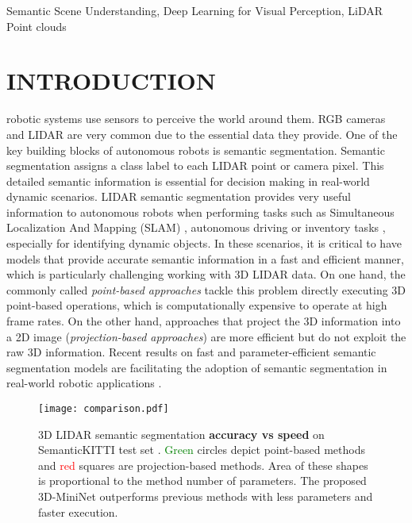 \documentclass[letterpaper, 10 pt, journal, twoside]{IEEEtran}
\begin{document}
\begin{IEEEkeywords}
Semantic Scene Understanding, Deep Learning for Visual Perception, LiDAR Point clouds
\end{IEEEkeywords}


\section{INTRODUCTION}
  robotic systems use sensors to perceive the world around them. RGB cameras and LIDAR are very common due to the essential data they provide. 
 One of the key building blocks of autonomous robots is semantic segmentation. Semantic segmentation assigns a class label to each LIDAR point or camera pixel.  This detailed semantic information is essential for decision making in real-world dynamic scenarios. 
 LIDAR semantic segmentation provides very useful information to autonomous robots when performing tasks such as Simultaneous Localization And Mapping (SLAM) \cite{jian2019semantic, zhao2019lidar}, autonomous driving \cite{milioto2019rangenet++} or inventory tasks \cite{chen2020sloam}, especially for identifying dynamic objects.
 In these scenarios, it is critical to have models that provide accurate semantic information in a  fast and efficient manner, which is particularly challenging working with 3D LIDAR data. 
 On one hand, the commonly called \textit{point-based approaches} \cite{qi2017pointnet++,qi2017pointnet,tangentconv} tackle this problem directly executing 3D point-based operations, which is computationally expensive to operate at high frame rates. On the other hand, approaches that project the 3D information into a 2D image (\textit{projection-based approaches}) are more efficient  \cite{wu2019squeezesegv2,milioto2019rangenet++,wu2018squeezeseg, wang2018pointseg, dewan2019deeptemporalseg} but do not exploit the raw 3D information. 
 Recent results on fast \cite{milioto2019rangenet++} and parameter-efficient \cite{zhang2019shellnet} semantic segmentation models are facilitating the adoption of semantic segmentation in real-world robotic applications \cite{li2020integrate, behley2019semantickitti}. 
  
  
\begin{figure}[!t]
\centering
\texttt{[image: comparison.pdf]}
\caption{3D LIDAR semantic segmentation \textbf{accuracy vs speed} on SemanticKITTI test set \cite{behley2019semantickitti}.
\textcolor{Green}{Green} circles depict point-based methods and \textcolor{Red}{red} squares are projection-based methods. Area of these shapes is proportional to the method number of parameters. The proposed 3D-MiniNet outperforms previous methods with less parameters and faster execution. }
\label{fig:fast-efficient}
\end{figure} 
\end{document}
